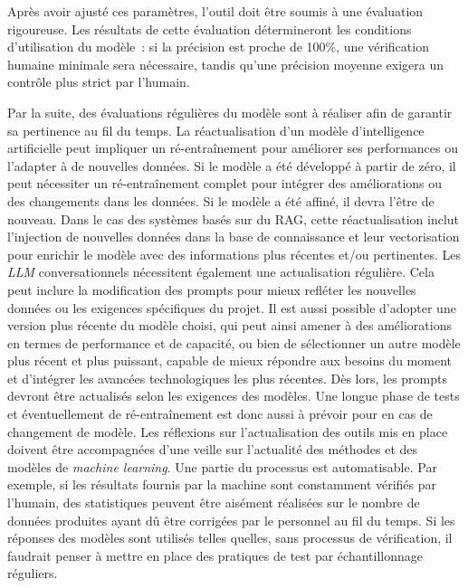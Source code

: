 Après avoir ajusté ces paramètres, l'outil doit être soumis à une évaluation rigoureuse. 
Les résultats de cette évaluation détermineront les conditions d'utilisation du modèle~: 
si la précision est proche de 100\%, une vérification humaine minimale sera nécessaire, tandis qu'une précision moyenne exigera un contrôle plus strict par l'humain.

Par la suite, des évaluations régulières du modèle sont à réaliser afin de garantir sa pertinence au fil du temps. 
La réactualisation d'un modèle d'intelligence artificielle peut impliquer un ré-entraînement pour améliorer ses performances ou l'adapter à de nouvelles données. Si le modèle a été développé à partir de zéro, il peut nécessiter un ré-entraînement complet pour intégrer des améliorations ou des changements dans les données. Si le modèle a été affiné, il devra l'être de nouveau. Dans le cas des systèmes basés sur du \gls{RAG}, cette réactualisation inclut l'injection de nouvelles données dans la base de connaissance et leur \gls{vectorisation} pour enrichir le modèle avec des informations plus récentes et/ou pertinentes. Les \emph{LLM} conversationnels nécessitent également une actualisation régulière. Cela peut inclure la modification des prompts pour mieux refléter les nouvelles données ou les exigences spécifiques du projet. Il est aussi possible d'adopter une version plus récente du modèle choisi, qui peut ainsi amener à des améliorations en termes de performance et de capacité, ou bien de sélectionner un autre modèle plus récent et plus puissant, capable de mieux répondre aux besoins du moment et d'intégrer les avancées technologiques les plus récentes. Dès lors, les prompts devront être actualisés selon les exigences des modèles.
 Une longue phase de tests et éventuellement de ré-entraînement est donc aussi à prévoir pour en cas de changement de modèle. Les réflexions sur l'actualisation des outils mis en place doivent être accompagnées d'une veille sur l'actualité des méthodes et des modèles de \emph{machine learning}.
Une partie du processus est automatisable. Par exemple, si les résultats fournis par la machine sont constamment vérifiés par l'humain, des statistiques peuvent être aisément réalisées sur le nombre de données produites ayant dû être corrigées par le personnel au fil du temps. Si les réponses des modèles sont utilisés telles quelles, sans processus de vérification, il faudrait penser à mettre en place des pratiques de test par échantillonnage réguliers.

